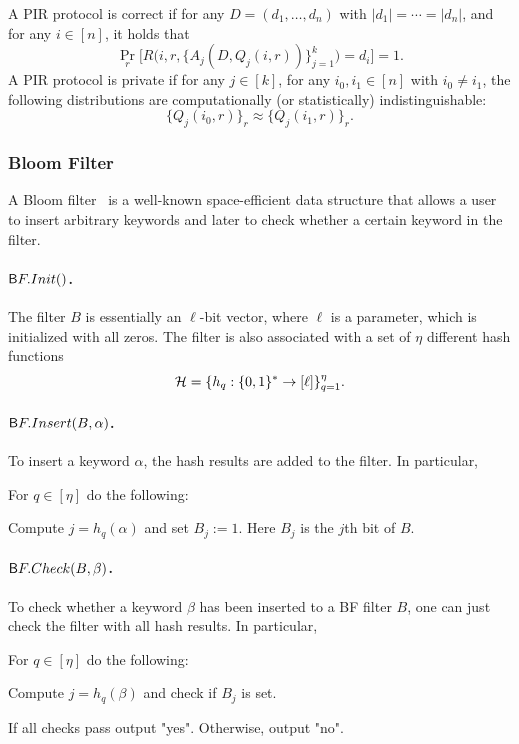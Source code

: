 A PIR protocol is correct if for any $D = (d_1, \ldots, d_n)$ with $|d_1| =
\cdots = |d_n|$, and for any $i \in [n]$, it holds that 
    $$\Pr_r \bigg [ R \Big(i, r, \big \{ A_j(D, Q_j(i,r)) \big \}_{j=1}^k \Big ) = d_i \bigg ] = 1.$$
%
A PIR protocol is private if for any $j \in [k]$, for any $i_0, i_1 \in
[n]$ with $i_0 \ne i_1$, the following distributions are computationally
(or statistically) indistinguishable: 
  $$\{Q_j(i_0, r)\}_r \approx \{Q_j(i_1, r)\}_r.$$

   

\subsubsection{Bloom Filter}
A Bloom filter~\cite{bloom70spacetime} is a well-known space-efficient
data structure that allows a user to insert arbitrary keywords and later
to check whether a certain keyword in the filter. 

\paragraph{$\sf BF.Init()$.}
The filter $B$ is essentially an $\ell$-bit vector, where $\ell$ is a
parameter, which is initialized with all zeros.
%
The filter is also associated with a set of $\eta$ different hash
functions $$\HHH = \{ h_q: \zo^* \to [\ell] \}_{q=1}^\eta.$$  


\paragraph{$\sf BF.Insert(B, \alpha)$.}
To insert a keyword $\alpha$, the hash results are added to the
filter. In particular, 
  \BI
  \item For $q \in [\eta]$ do the following:
    \BI
    \item[] 
    Compute $j = h_q(\alpha)$ and set $B_j := 1$. Here $B_j$ is the $j$th bit of $B$.  
    \EI
  \EI

\paragraph{$\sf BF.Check(B, \beta)$.}
To check whether a keyword $\beta$ has been inserted to a BF filter
$B$, one can just check the filter with all hash results. In particular, 
  \BI
  \item For $q \in [\eta]$ do the following: 
    \BI
    \item[] Compute  $j = h_q(\beta)$ and check if $B_j$ is set. 
    \EI
  \item If all checks pass output "yes". Otherwise, output "no".
  \EI

